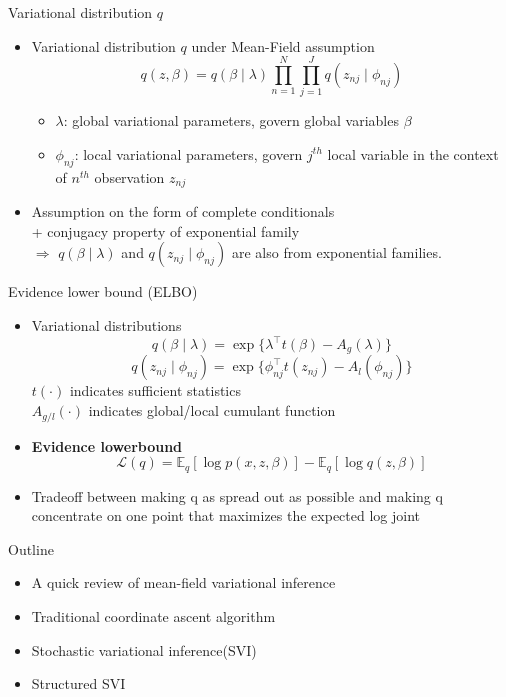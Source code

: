 \documentclass[aspectratio=169]{beamer}
\newenvironment{greytext}{\color{gray}}{\ignorespacesafterend}
\begin{document}
\begin{frame}{Variational distribution $q$}
    \begin{itemize}
        \item Variational distribution $q$ under Mean-Field assumption
        \[q(z,\beta) = q(\beta \mid \lambda) \prod_{n=1}^N\prod_{j=1}^Jq(z_{nj} \mid \phi_{nj})\]
        \begin{itemize}
            \item $\lambda$: global variational parameters, govern global variables $\beta$
            \item $\phi_{nj}$: local variational parameters, govern $j^{th}$ local variable in the context of $n^{th}$ observation $z_{nj}$
        \end{itemize}
        \item Assumption on the form of complete conditionals \\+ conjugacy property of exponential family \\$\Rightarrow$ $q(\beta \mid \lambda)$ and $q(z_{nj} \mid \phi_{nj})$ are also from exponential families.
    \end{itemize}
\end{frame}

\begin{frame}{Evidence lower bound (ELBO)}
    \begin{itemize}
        \item Variational distributions
        \[q(\beta \mid \lambda) = \exp\{\lambda^{\top}t(\beta) - A_g(\lambda)\}\]
        \[q(z_{nj} \mid \phi_{nj}) = \exp\{\phi_{nj}^{\top}t(z_{nj}) - A_l(\phi_{nj})\}\]
        $t(\cdot)$ indicates sufficient statistics\\
        $A_{g/l}(\cdot)$ indicates global/local cumulant function
        \item \textbf{Evidence lowerbound}\\
        \[\mathcal{L}(q) = \mathbb{E}_q[\log p(x,z,\beta)] - \mathbb{E}_q[\log q(z,\beta)]\]
        \item Tradeoff between making q as spread out as possible and making q concentrate on one point that maximizes the expected log joint
    \end{itemize}
\end{frame}

\begin{frame}{Outline}

    \begin{itemize}
    \begin{greytext}
      \item A quick review of mean-field variational inference
    \end{greytext}
      \item Traditional coordinate ascent algorithm
    \begin{greytext}
      \item Stochastic variational inference(SVI)
      \item Structured SVI
      \end{greytext}
    \end{itemize}

\end{frame}
\end{document}

